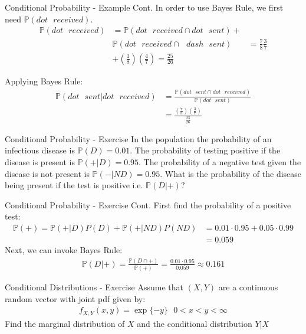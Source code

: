 \documentclass{beamer}
\begin{document}
\begin{frame}{Conditional Probability - Example Cont.}
In order to use Bayes Rule, we first need $\mathbb{P}(dot \>\>\> received)$.
\begin{align*}
\mathbb{P}(dot \>\>\> received) &= \mathbb{P}(dot \>\>\> received \cap dot \>\>\> sent) + \\ 
&\mathbb{P}(dot \>\>\> received \cap \>\>\> dash \>\>\> sent) &= \frac{7}{8}\frac{3}{7} \\
&+ \left(\frac{1}{8}\right)\left(\frac{4}{7}\right) = \frac{25}{26}
\end{align*}

Applying Bayes Rule:
\begin{align*}
\mathbb{P}(dot\>\>\> sent| dot \>\>\> received)  &= \frac{\mathbb{P}(dot \>\>\> sent \cap dot \>\>\> received)}{\mathbb{P}(dot \>\>\> sent)} \\
&= \frac{\left(\frac{7}{8}\right)\left(\frac{3}{7}\right)}{\frac{25}{26}}
\end{align*}
\end{frame}

\begin{frame}{Conditional Probability - Exercise}
In the population the probability of an infectious disease is $\mathbb{P}(D) = 0.01$. The probability of testing positive if the disease is present is $\mathbb{P}(+|D) = 0.95$. The probability of a negative test given the disease is not present is $\mathbb{P}(-|ND) = 0.95$. What is the probability of the disease being present if the test is positive i.e. $\mathbb{P}(D|+)?$
\end{frame}

\begin{frame}{Conditional Probability - Exercise Cont.}
First find the probability of a positive test:
\begin{align*}
\mathbb{P}(+) = \mathbb{P}(+|D)P(D) + \mathbb{P}(+|ND)P(ND) &= 0.01 \cdot 0.95 + 0.05 \cdot 0.99\\
 &= 0.059
\end{align*}
Next, we can invoke Bayes Rule:
\begin{align*}
\mathbb{P}(D|+) = \frac{\mathbb{P}(D \cap +)}{\mathbb{P}(+)} = \frac{0.01\cdot 0.95}{0.059} \approx 0.161
\end{align*}
\end{frame}



\begin{frame}{Conditional Distributions - Exercise}
Assume that $(X, Y)$ are a continuous random vector with joint pdf given by:
\begin{align*}
f_{X, Y}(x, y) = \exp\{-y\}\>\>\> 0<x<y<\infty
\end{align*}
Find the marginal distribution of $X$ and the conditional distribution $Y|X$
\end{frame}
\end{document}
